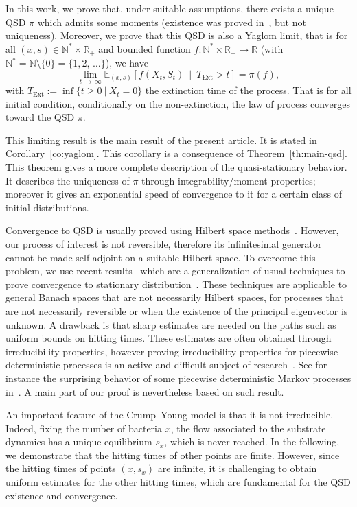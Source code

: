 \documentclass[10pt]{amsart}
\theoremstyle{definition}\newtheorem{defi}[theo]{Definition}\newtheorem{rema}[theo]{Remark}\newtheorem{exam}[theo]{Example}\newtheorem{exem}[theo]{Example}\newtheorem{nota}[theo]{Notation}
\newcommand{\RR}{\mathbb{R}}
\newcommand{\NN}{\mathbb{N}}
\newcommand{\EE}{\mathbb{E}}
\newcommand{\Text}{T_{\mathrm{Ext}}}
\newcommand{\1}{\mathbf{1}}
\begin{document}
In this work, we prove that, under suitable assumptions, there exists a unique QSD $\pi$ which admits some moments (existence was proved in~\cite{CMMS}, but not uniqueness). Moreover, we prove that this QSD is also a Yaglom limit, that is for all $(x,s) \in \NN^* \times \RR_+$ and bounded function $f:\NN^{*}\times \RR_+\to \RR$ (with $\NN^*=\NN\setminus\{0\} = \{1,2,\,\dots\}$), we have
\[
\lim_{t\,\to\,\infty} \EE_{(x,s)} \left[f(X_t,S_t) \ \middle| \ \Text>t\right] = \pi(f),
\]
with $\Text:=\inf\{t\geq 0 \ | \ X_t=0 \}$ the extinction time of the process. That is for all initial condition, conditionally on the non-extinction, the law of process converges toward the QSD $\pi$.

This limiting result is the main result of the present article. It is stated in Corollary~\ref{co:yaglom}. This corollary is a consequence of Theorem~\ref{th:main-qsd}. This theorem gives a more complete description of the quasi-stationary behavior. It describes the uniqueness of $\pi$ through integrability/moment properties; moreover it gives an exponential speed of convergence to it for a certain class of initial distributions.

Convergence to QSD is usually proved using Hilbert space methods~\cite{CCLMMS,CMS13,VD91}. However, our process of interest is not reversible, therefore its infinitesimal generator cannot be made self-adjoint on a suitable Hilbert space. To overcome this problem, we use recent results~\cite{BCGM,CG20,CV20,CV17} which are a generalization of usual techniques to prove convergence to stationary distribution~\cite{MT12}. These techniques are applicable to general Banach spaces that are not necessarily Hilbert spaces, for processes that are not necessarily reversible or when the existence of the principal eigenvector is unknown. A drawback is that sharp estimates are needed on the paths such as uniform bounds on hitting times. These estimates are often obtained through irreducibility properties, however proving irreducibility properties for piecewise deterministic processes is an active and difficult subject of research~\cite{BHS18,BLMZ15,BS19,C16}. See for instance the surprising behavior of some piecewise deterministic Markov processes in~\cite{BLMZ14,LMR13}. A main part of our proof is nevertheless based on such result.

An important feature of the Crump--Young model is that it is not irreducible. Indeed, fixing the number of bacteria $x$, the flow associated to the substrate dynamics has a unique equilibrium $\bar s_x$, which is never reached. In the following, we demonstrate that the hitting times of other points are finite. However, since the hitting times of points $(x,\bar s_x)$ are infinite, it is challenging to obtain uniform estimates for the other hitting times, which are fundamental for the QSD existence and convergence.
\end{document}
